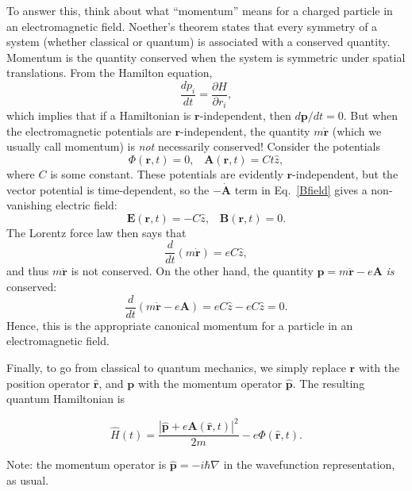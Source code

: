 \documentclass[pra,12pt]{revtex4}
\begin{document}
To answer this, think about what ``momentum'' means for a charged
particle in an electromagnetic field.  Noether's theorem states that
every symmetry of a system (whether classical or quantum) is
associated with a conserved quantity.  Momentum is the quantity
conserved when the system is symmetric under spatial translations.
From the Hamilton equation,
\begin{equation*}
  \frac{dp_i}{dt} = \frac{\partial H}{\partial r_i},
\end{equation*}
which implies that if a Hamiltonian is $\mathbf{r}$-independent, then
$d\mathbf{p}/dt = 0$.  But when the electromagnetic potentials are
$\mathbf{r}$-independent, the quantity $m\dot{\mathbf{r}}$ (which we
usually call momentum) is \textit{not} necessarily conserved!
Consider the potentials
\begin{equation}
  \Phi(\mathbf{r}, t) = 0, \;\;\; \mathbf{A}(\mathbf{r}, t) = Ct \hat{z},
\end{equation}
where $C$ is some constant.  These potentials are evidently
$\mathbf{r}$-independent, but the vector potential is time-dependent,
so the $-\dot{\mathbf{A}}$ term in Eq.~\eqref{Bfield} gives a
non-vanishing electric field:
\begin{equation}
  \mathbf{E}(\mathbf{r},t) = - C\hat{z}, \;\;\;\mathbf{B}(\mathbf{r},t) = 0.
\end{equation}
The Lorentz force law then says that
\begin{equation}
  \frac{d}{dt}(m\dot{\mathbf{r}}) = eC\hat{z},
\end{equation}
and thus $m\dot{\mathbf{r}}$ is not conserved.  On the other hand, the
quantity $\mathbf{p} = m\dot{\mathbf{r}} - e \mathbf{A}$ \textit{is}
conserved:
\begin{equation}
  \frac{d}{dt}(m\dot{\mathbf{r}} - e\mathbf{A}) =
  eC\hat{z} - eC\hat{z} = 0.
\end{equation}
Hence, this is the appropriate canonical momentum for a particle in an
electromagnetic field.

Finally, to go from classical to quantum mechanics, we simply replace
$\mathbf{r}$ with the position operator $\hat{\mathbf{r}}$, and
$\mathbf{p}$ with the momentum operator $\hat{\mathbf{p}}$.  The
resulting quantum Hamiltonian is
\begin{framed}
  \begin{equation}
    \hat{H}(t) = \frac{|\hat{\mathbf{p}}+e\mathbf{A}(\hat{\mathbf{r}},t)|^2}{2m}
    - e\Phi(\hat{\mathbf{r}},t).
    \label{quantumH}
  \end{equation}
\end{framed}
\vskip -0.15in
\noindent
Note: the momentum operator is $\hat{\mathbf{p}} = -i\hbar\nabla$
in the wavefunction representation, as usual.
\end{document}
